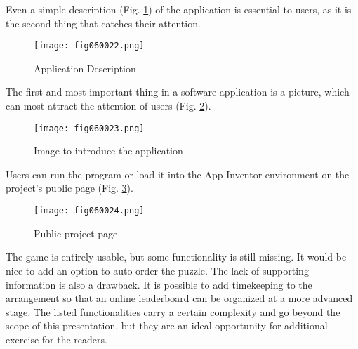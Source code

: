Even a simple description (Fig. \ref{fig060022}) of the application is essential to users, as it is the second thing that catches their attention.

\begin{figure}[H]
   \centering
   \texttt{[image: fig060022.png]}
   \caption{Application Description}
\label{fig060022}
\end{figure}

The first and most important thing in a software application is a picture, which can most attract the attention of users (Fig. \ref{fig060023}).

\begin{figure}[H]
   \centering
   \texttt{[image: fig060023.png]}
   \caption{Image to introduce the application}
\label{fig060023}
\end{figure}

Users can run the program or load it into the App Inventor environment on the project's public page (Fig. \ref{fig060024}).

\begin{figure}[H]
   \centering
   \texttt{[image: fig060024.png]}
   \caption{Public project page}
\label{fig060024}
\end{figure}

The game is entirely usable, but some functionality is still missing. It would be nice to add an option to auto-order the puzzle. The lack of supporting information is also a drawback. It is possible to add timekeeping to the arrangement so that an online leaderboard can be organized at a more advanced stage. The listed functionalities carry a certain complexity and go beyond the scope of this presentation, but they are an ideal opportunity for additional exercise for the readers. 
